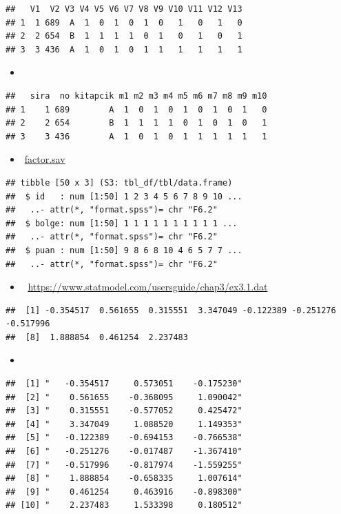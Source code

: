 \documentclass[
  oneside]{book}
\providecommand{\tightlist}{%
  \setlength{\itemsep}{0pt}\setlength{\parskip}{0pt}}
\begin{document}
\begin{verbatim}
##   V1  V2 V3 V4 V5 V6 V7 V8 V9 V10 V11 V12 V13
## 1  1 689  A  1  0  1  0  1  0   1   0   1   0
## 2  2 654  B  1  1  1  1  0  1   0   1   0   1
## 3  3 436  A  1  0  1  0  1  1   1   1   1   1
\end{verbatim}

\begin{itemize}
\tightlist
\item
\end{itemize}

\begin{verbatim}
##   sira  no kitapcik m1 m2 m3 m4 m5 m6 m7 m8 m9 m10
## 1    1 689        A  1  0  1  0  1  0  1  0  1   0
## 2    2 654        B  1  1  1  1  0  1  0  1  0   1
## 3    3 436        A  1  0  1  0  1  1  1  1  1   1
\end{verbatim}

\begin{itemize}
\tightlist
\item
  🔗\href{import/factor.sav}{factor.sav}
\end{itemize}

\begin{verbatim}
## tibble [50 x 3] (S3: tbl_df/tbl/data.frame)
##  $ id   : num [1:50] 1 2 3 4 5 6 7 8 9 10 ...
##   ..- attr(*, "format.spss")= chr "F6.2"
##  $ bolge: num [1:50] 1 1 1 1 1 1 1 1 1 1 ...
##   ..- attr(*, "format.spss")= chr "F6.2"
##  $ puan : num [1:50] 9 8 6 8 10 4 6 5 7 7 ...
##   ..- attr(*, "format.spss")= chr "F6.2"
\end{verbatim}

\begin{itemize}
\tightlist
\item
  🔗 \url{https://www.statmodel.com/usersguide/chap3/ex3.1.dat}
\end{itemize}

\begin{verbatim}
##  [1] -0.354517  0.561655  0.315551  3.347049 -0.122389 -0.251276 -0.517996
##  [8]  1.888854  0.461254  2.237483
\end{verbatim}

\begin{itemize}
\tightlist
\item
\end{itemize}

\begin{verbatim}
##  [1] "   -0.354517     0.573051    -0.175230"
##  [2] "    0.561655    -0.368095     1.090042"
##  [3] "    0.315551    -0.577052     0.425472"
##  [4] "    3.347049     1.088520     1.149353"
##  [5] "   -0.122389    -0.694153    -0.766538"
##  [6] "   -0.251276    -0.017487    -1.367410"
##  [7] "   -0.517996    -0.817974    -1.559255"
##  [8] "    1.888854    -0.658335     1.007614"
##  [9] "    0.461254     0.463916    -0.898300"
## [10] "    2.237483     1.533398     0.180512"
\end{verbatim}
\end{document}
